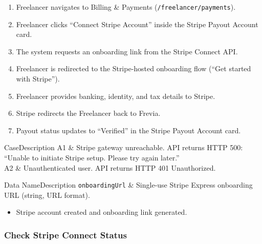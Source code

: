 \begin{enumerate}[leftmargin=1.8em,topsep=3pt,itemsep=2pt,parsep=0pt]
      \item Freelancer navigates to Billing \& Payments (\texttt{/freelancer/payments}).
      \item Freelancer clicks ``Connect Stripe Account'' inside the Stripe Payout Account card.
      \item The system requests an onboarding link from the Stripe Connect API.
      \item Freelancer is redirected to the Stripe-hosted onboarding flow (``Get started with Stripe'').
      \item Freelancer provides banking, identity, and tax details to Stripe.
      \item Stripe redirects the Freelancer back to Frevia.
      \item Payout status updates to ``Verified'' in the Stripe Payout Account card.
\end{enumerate}

\begin{flowtable}{Case}{Description}
      A1 & Stripe gateway unreachable. API returns HTTP 500: ``Unable to initiate Stripe setup. Please try again later.''\\ \hline
      A2 & Unauthenticated user. API returns HTTP 401 Unauthorized.\\ \hline
\end{flowtable}

\begin{specdatatable}{Data Name}{Description}
      \texttt{onboardingUrl} & Single-use Stripe Express onboarding URL (string, URL format).\\ \hline
\end{specdatatable}

\begin{itemize}[leftmargin=1.6em,topsep=3pt,itemsep=2pt,parsep=0pt,label=$\bullet$]
      \item Stripe account created and onboarding link generated.
\end{itemize}

\subsubsection{ Check Stripe Connect Status}


